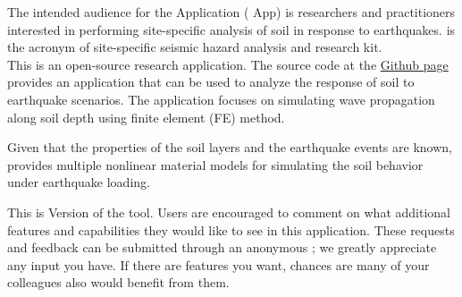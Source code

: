 The intended audience for the \texttt{\getsoftwarename{}} Application (\texttt{\getsoftwarename{}} App) is researchers and practitioners
interested in performing site-specific analysis of soil in  response to earthquakes. \texttt{\getsoftwarename{}}  is the acronym of site-specific seismic hazard analysis and research kit.  \\

This is an open-source research application. The source code at
the \href{https://github.com/NHERI-SimCenter/s3hark}{\texttt{\getsoftwarename{}}
Github page} provides an application that can be used to analyze the response of soil to earthquake scenarios.
The application focuses on simulating wave propagation along soil depth using finite element (FE) method. 

Given that the properties of the soil layers and the earthquake events are known,
 \texttt{\getsoftwarename{}} provides multiple nonlinear material models for simulating the soil behavior under earthquake loading.



This is Version \getsoftwareversion{} of the tool. Users are
encouraged to comment on what additional features and capabilities
they would like to see in this application. These requests and
feedback can be submitted through an anonymous ; we greatly appreciate any input you have. If there are
features you want, chances are many of your colleagues also would
benefit from them. 
